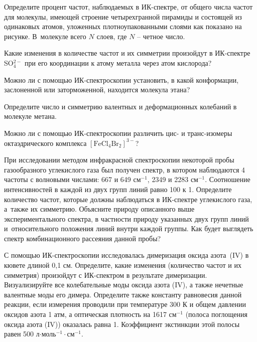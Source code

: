  Определите процент частот, наблюдаемых в ИК-спектре, от общего числа частот для молекулы, имеющей строение четырехгранной пирамиды и состоящей из одинаковых атомов, уложенных плотноупакованными слоями как показано на рисунке. В~молекуле всего $N$ слоев, где $N$ – четное число.
\par
{} Какие изменения в количестве частот и их симметрии произойдут в ИК\nobreakdash-спектре SO$_4^{2-}$ при его координации к атому металла через атом кислорода?
\par
{} Можно ли с помощью ИК-спектроскопии установить, в какой конформации, заслоненной или заторможенной, находится молекула этана?
\par
{} Определите число и симметрию валентных и деформационных колебаний в молекуле метана.
\par
{} Можно ли с помощью ИК-спектроскопии различить цис- и транс-изомеры октаэдрического комплекса $[\text{FeCl}_4\text{Br}_2]^{3-}$?
\par
{} При исследовании методом инфракрасной спектроскопии некоторой пробы газообразного углекислого газа был получен спектр, в котором наблюдаются 4 частоты с волновыми числами: 667 и 649 см$^{-1}$, 2349 и 2283 см$^{-1}$. Соотношение интенсивностей в каждой из двух групп линий равно 100 к 1. Определите количество частот, которые должны наблюдаться в ИК-спектре углекислого газа, а~также их симметрию. Объясните природу описанного выше экспериментального спектра, в частности природу указанных двух групп линий и~относительного положения линий внутри каждой группы. Как будет выглядеть спектр комбинационного рассеяния данной пробы?
\par
{} С помощью ИК-спектроскопии исследовалась димеризация оксида азота~(IV) в кювете длиной 0,1 см. Определите, какие изменения (количество частот и их симметрия) произойдут с ИК-спектром в результате димеризации. Визуализируйте все колебательные моды оксида азота (IV), а также нечетные валентные моды его димера. Определите также константу равновесия данной реакции, если измерения проводили при температуре 300 К и общем давлении оксидов азота 1 атм, а оптическая плотность на 1617 см$^{-1}$ (полоса поглощения оксида азота (IV)) оказалась равна 1. Коэффициент экстинкции этой полосы равен 500 л$\cdot$моль$^{-1}\cdot$см$^{-1}$.
\par
